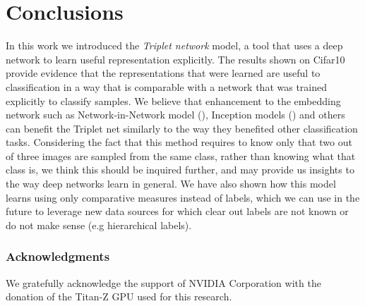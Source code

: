 \documentclass{article} %
\begin{document}
\section{Conclusions}
In this work we introduced the \emph{Triplet network} model, a tool that uses a deep network to learn useful representation explicitly.
The results shown on Cifar10 provide evidence that the representations that were learned are useful to classification in a way that is comparable with a network that was trained explicitly to classify samples. We believe that enhancement to the embedding network
such as Network-in-Network model (\citet{LinCY13}), Inception models (\citet{inception}) and others can benefit the Triplet net similarly to the way they benefited other classification tasks.
Considering the fact that this method requires to know only that two out of three images are sampled from the same class, rather than knowing what that class is, we think this should be inquired further, and may provide us insights
to the way deep networks learn in general.
We have also shown how this model learns using only comparative measures instead of labels, which we can use in the future to leverage new data sources for which clear out labels are not known or do not make sense (e.g hierarchical labels).
\subsubsection*{Acknowledgments}

We gratefully acknowledge the support of NVIDIA Corporation with the donation of the Titan-Z GPU used for this research.



\end{document}
